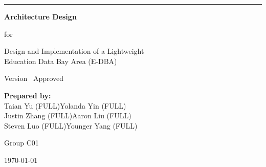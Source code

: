 \begin{flushright}
    \vspace*{1.5cm}
    \rule{0.75\textwidth}{5pt}
    
    \vspace{1.2cm}
    \fontsize{30}{28}\selectfont
    \textbf{Architecture Design}
    
    \vspace{1.5cm}
    \fontsize{14}{16}\selectfont
    for
    
    \vspace{1cm}
    \fontsize{18}{22}\selectfont
    Design and Implementation of a Lightweight \\[0.3em]
    Education Data Bay Area (E-DBA)
    
    \vspace{1.5cm}
    \fontsize{13}{15}\selectfont
    Version \myversion\ Approved
    
    \vspace{1.8cm}
    \begin{minipage}{0.7\textwidth}
    \flushright
    \fontsize{12}{14}\selectfont
    \textbf{Prepared by:} \\
    Taian Yu (FULL)\quad Yolanda Yin (FULL) \\
    Justin Zhang (FULL)\quad Aaron Liu (FULL) \\
    Steven Luo (FULL)\quad Younger Yang (FULL)
    \end{minipage}
    
    \vspace{1.2cm}
    \fontsize{14}{16}\selectfont
    Group C01
    
    \vspace{2cm}
    \today
\end{flushright}